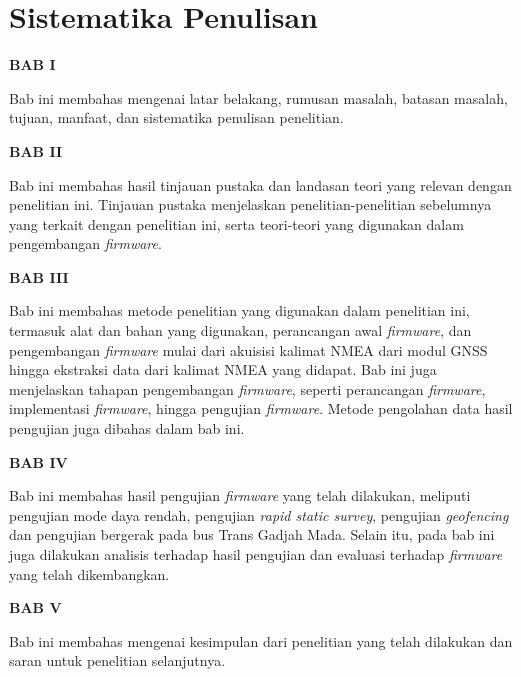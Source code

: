 \section{Sistematika Penulisan}
\textbf{BAB I}

Bab ini membahas mengenai latar belakang, rumusan masalah, batasan masalah, tujuan, manfaat, dan sistematika penulisan penelitian.

\textbf{BAB II}

Bab ini membahas hasil tinjauan pustaka dan landasan teori yang relevan dengan penelitian ini. Tinjauan pustaka menjelaskan penelitian-penelitian sebelumnya yang terkait dengan penelitian ini, serta teori-teori yang digunakan dalam pengembangan \textit{firmware}.

\textbf{BAB III}

Bab ini membahas metode penelitian yang digunakan dalam penelitian ini, termasuk alat dan bahan yang digunakan, perancangan awal \textit{firmware}, dan pengembangan \textit{firmware} mulai dari akuisisi kalimat NMEA dari modul GNSS hingga ekstraksi data dari kalimat NMEA yang didapat. Bab ini juga menjelaskan tahapan pengembangan \textit{firmware}, seperti perancangan \textit{firmware}, implementasi \textit{firmware}, hingga pengujian \textit{firmware}. Metode pengolahan data hasil pengujian juga dibahas dalam bab ini.  

\textbf{BAB IV}

Bab ini membahas hasil pengujian \textit{firmware} yang telah dilakukan, meliputi pengujian mode daya rendah, pengujian \textit{rapid static survey}, pengujian \textit{geofencing} dan pengujian bergerak pada bus Trans Gadjah Mada. Selain itu, pada bab ini juga dilakukan analisis terhadap hasil pengujian dan evaluasi terhadap \textit{firmware} yang telah dikembangkan.

\textbf{BAB V}

Bab ini membahas mengenai kesimpulan dari penelitian yang telah dilakukan dan saran untuk penelitian selanjutnya.